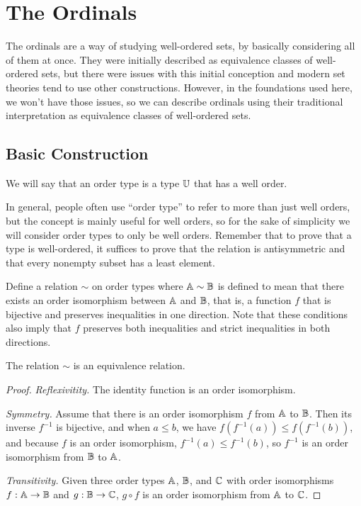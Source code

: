 \documentclass[../../math.tex]{subfiles}
\begin{document}
\setcounter{chapter}{8}

\chapter{The Ordinals}

The ordinals are a way of studying well-ordered sets, by basically considering
all of them at once.  They were initially described as equivalence classes of
well-ordered sets, but there were issues with this initial conception and modern
set theories tend to use other constructions.  However, in the foundations used
here, we won't have those issues, so we can describe ordinals using their
traditional interpretation as equivalence classes of well-ordered sets.

\section{Basic Construction}

\begin{definition}
    We will say that an order type is a type $\mathbb{U}$ that has a well order.
\end{definition}

In general, people often use ``order type'' to refer to more than just well
orders, but the concept is mainly useful for well orders, so for the sake of
simplicity we will consider order types to only be well orders.  Remember that
to prove that a type is well-ordered, it suffices to prove that the relation is
antisymmetric and that every nonempty subset has a least element.

\begin{definition}
    Define a relation $\sim$ on order types where $\mathbb{A} \sim \mathbb{B}$ is defined to
    mean that there exists an order isomorphism between $\mathbb{A}$ and $\mathbb{B}$, that is,
    a function $f$ that is bijective and preserves inequalities in one
    direction.  Note that these conditions also imply that $f$ preserves both
    inequalities and strict inequalities in both directions.
\end{definition}

\begin{lemma}
    The relation $\sim$ is an equivalence relation.
\end{lemma}
\begin{proof}
    \textit{Reflexivitity.}  The identity function is an order isomorphism.

    \textit{Symmetry.}  Assume that there is an order isomorphism $f$ from $\mathbb{A}$
    to $\mathbb{B}$.  Then its inverse $f^{-1}$ is bijective, and when $a \leq b$, we
    have $f(f^{-1}(a)) \leq f(f^{-1}(b))$, and because $f$ is an order
    isomorphism, $f^{-1}(a) \leq f^{-1}(b)$, so $f^{-1}$ is an order isomorphism
    from $\mathbb{B}$ to $\mathbb{A}$.

    \textit{Transitivity.}  Given three order types $\mathbb{A}$, $\mathbb{B}$, and $\mathbb{C}$ with
    order isomorphisms $f : \mathbb{A} \to \mathbb{B}$ and $g : \mathbb{B} \to \mathbb{C}$, $g \circ f$ is an
    order isomorphism from $\mathbb{A}$ to $\mathbb{C}$.
\end{proof}
\end{document}
